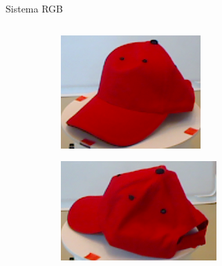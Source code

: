 \documentclass[]{beamer}
\begin{document}
\begin{frame}{Sistema RGB}
\begin{columns}
\begin{column}{5cm}
{                \begin{figure}
                	\centering
                	\begin{subfigure}[b]{0.4\textwidth}
                		\includegraphics[width=\textwidth]{img/templates/0_crop.png}
                	\end{subfigure}
                	\quad
                	\begin{subfigure}[b]{0.4\textwidth}
                		\includegraphics[width=\textwidth]{img/templates/90_crop.png}
                	\end{subfigure}


\end{figure}}
\end{column}
\end{columns}
\end{frame}
\end{document}

